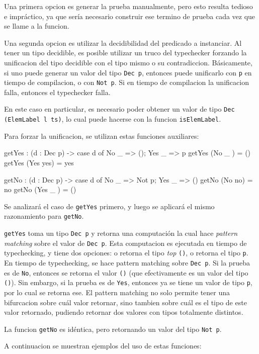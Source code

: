 Una primera opcion es generar la prueba manualmente, pero esto resulta tedioso e impráctico, ya que sería necesario construir ese termino de prueba cada vez que se llame a la funcion.

Una segunda opcion es utilizar la decidibilidad del predicado a instanciar. Al tener un tipo decidible, es posible utilizar un truco del typechecker forzando la unificacion del tipo decidible con el tipo mismo o su contradiccion.
Básicamente, si uno puede generar un valor del tipo \texttt{Dec p}, entonces puede unificarlo con \texttt{p} en tiempo de compilacion, o con \texttt{Not p}. Si en tiempo de compilacion la unificacion falla, entonces el typechecker falla.

En este caso en particular, es necesario poder obtener un valor de tipo \texttt{Dec (ElemLabel l ts)}, lo cual puede hacerse con la funcion \texttt{isElemLabel}.

Para forzar la unificacion, se utilizan estas funciones auxiliares:

\begin{code}
getYes : (d : Dec p) -> 
  case d of { No _ => (); Yes _ => p}
getYes (No _ ) = ()
getYes (Yes yes) = yes

getNo : (d : Dec p) -> 
  case d of { No _ => Not p; Yes _ => ()}
getNo (No no) = no
getNo (Yes _ ) = ()
\end{code}

Se analizará el caso de \texttt{getYes} primero, y luego se aplicará el mismo razonamiento para \texttt{getNo}.

\texttt{getYes} toma un tipo \texttt{Dec p} y retorna una computación la cual hace \textit{pattern matching} sobre el valor de \texttt{Dec p}. Esta computacion es ejecutada en tiempo de typechecking, y tiene dos opciones: o retorna el tipo \textit{top} \texttt{()}, o retorna el tipo \texttt{p}.
En tiempo de typechecking, se hace pattern matching sobre \texttt{Dec p}. Si la prueba es de \texttt{No}, entonces se retorna el valor \texttt{()} (que efectivamente es un valor del tipo \texttt{()}). Sin embargo, si la prueba es de \texttt{Yes}, entonces ya se tiene un valor de tipo \texttt{p}, por lo cual se retorna ese. El pattern matching no solo permite tener una bifurcacion sobre cuál valor retornar, sino tambien sobre cuál es el tipo de este valor retornado, pudiendo retornar dos valores con tipos totalmente distintos.

La funcion \texttt{getNo} es idéntica, pero retornando un valor del tipo \texttt{Not p}.

A continuacion se muestran ejemplos del uso de estas funciones:

